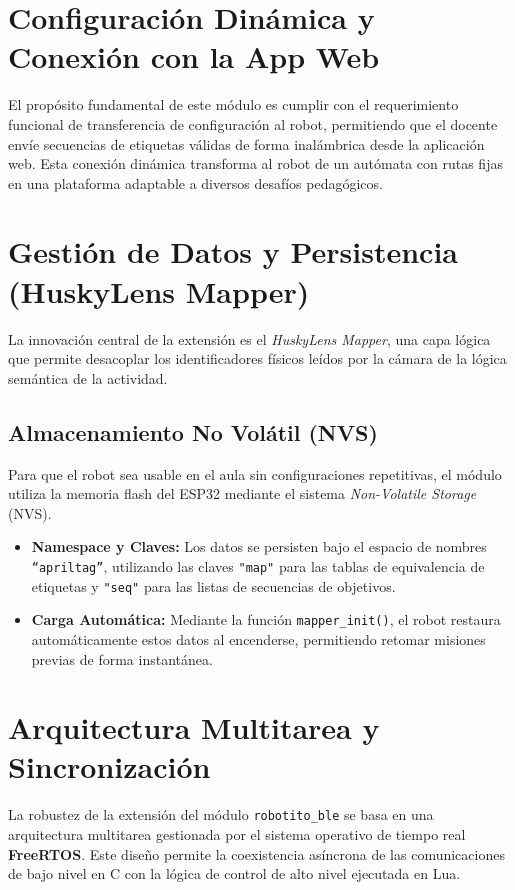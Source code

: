 \documentclass{prgrado}
\begin{document}
\section{Configuración Dinámica y Conexión con la App Web}
El propósito fundamental de este módulo es cumplir con el requerimiento funcional de transferencia de configuración al robot, permitiendo que el docente envíe secuencias de etiquetas válidas de forma inalámbrica desde la aplicación web. Esta conexión dinámica transforma al robot de un autómata con rutas fijas en una plataforma adaptable a diversos desafíos pedagógicos.

\section{Gestión de Datos y Persistencia (HuskyLens Mapper)}
La innovación central de la extensión es el \textit{HuskyLens Mapper}, una capa lógica que permite desacoplar los identificadores físicos leídos por la cámara de la lógica semántica de la actividad.

\subsection{Almacenamiento No Volátil (NVS)}
Para que el robot sea usable en el aula sin configuraciones repetitivas, el módulo utiliza la memoria flash del ESP32 mediante el sistema \textit{Non-Volatile Storage} (NVS). 
\begin{itemize}
    \item \textbf{Namespace y Claves:} Los datos se persisten bajo el espacio de nombres \texttt{``apriltag''}, utilizando las claves \texttt{"map"} para las tablas de equivalencia de etiquetas y \texttt{"seq"} para las listas de secuencias de objetivos.
    \item \textbf{Carga Automática:} Mediante la función \texttt{mapper\_init()}, el robot restaura automáticamente estos datos al encenderse, permitiendo retomar misiones previas de forma instantánea.
\end{itemize}

\section{Arquitectura Multitarea y Sincronización}

La robustez de la extensión del módulo \texttt{robotito\_ble} se basa en una arquitectura multitarea gestionada por el sistema operativo de tiempo real \textbf{FreeRTOS}. Este diseño permite la coexistencia asíncrona de las comunicaciones de bajo nivel en C con la lógica de control de alto nivel ejecutada en Lua.
\end{document}
